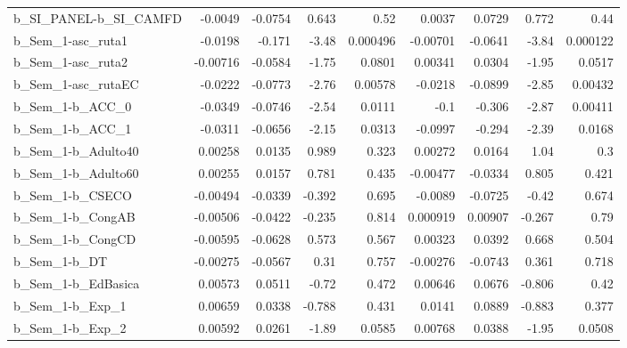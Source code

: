 \begin{tabular}{lrrrrrrrr}
b\_SI\_PANEL-b\_SI\_CAMFD      &     -0.0049 &      -0.0754 &     0.643 &     0.52 &     0.0037 &      0.0729 &        0.772 &          0.44 \\
b\_Sem\_1-asc\_ruta1          &     -0.0198 &       -0.171 &     -3.48 & 0.000496 &   -0.00701 &     -0.0641 &        -3.84 &      0.000122 \\
b\_Sem\_1-asc\_ruta2          &    -0.00716 &      -0.0584 &     -1.75 &   0.0801 &    0.00341 &      0.0304 &        -1.95 &        0.0517 \\
b\_Sem\_1-asc\_rutaEC         &     -0.0222 &      -0.0773 &     -2.76 &  0.00578 &    -0.0218 &     -0.0899 &        -2.85 &       0.00432 \\
b\_Sem\_1-b\_ACC\_0            &     -0.0349 &      -0.0746 &     -2.54 &   0.0111 &       -0.1 &      -0.306 &        -2.87 &       0.00411 \\
b\_Sem\_1-b\_ACC\_1            &     -0.0311 &      -0.0656 &     -2.15 &   0.0313 &    -0.0997 &      -0.294 &        -2.39 &        0.0168 \\
b\_Sem\_1-b\_Adulto40         &     0.00258 &       0.0135 &     0.989 &    0.323 &    0.00272 &      0.0164 &         1.04 &           0.3 \\
b\_Sem\_1-b\_Adulto60         &     0.00255 &       0.0157 &     0.781 &    0.435 &   -0.00477 &     -0.0334 &        0.805 &         0.421 \\
b\_Sem\_1-b\_CSECO            &    -0.00494 &      -0.0339 &    -0.392 &    0.695 &    -0.0089 &     -0.0725 &        -0.42 &         0.674 \\
b\_Sem\_1-b\_CongAB           &    -0.00506 &      -0.0422 &    -0.235 &    0.814 &   0.000919 &     0.00907 &       -0.267 &          0.79 \\
b\_Sem\_1-b\_CongCD           &    -0.00595 &      -0.0628 &     0.573 &    0.567 &    0.00323 &      0.0392 &        0.668 &         0.504 \\
b\_Sem\_1-b\_DT               &    -0.00275 &      -0.0567 &      0.31 &    0.757 &   -0.00276 &     -0.0743 &        0.361 &         0.718 \\
b\_Sem\_1-b\_EdBasica         &     0.00573 &       0.0511 &     -0.72 &    0.472 &    0.00646 &      0.0676 &       -0.806 &          0.42 \\
b\_Sem\_1-b\_Exp\_1            &     0.00659 &       0.0338 &    -0.788 &    0.431 &     0.0141 &      0.0889 &       -0.883 &         0.377 \\
b\_Sem\_1-b\_Exp\_2            &     0.00592 &       0.0261 &     -1.89 &   0.0585 &    0.00768 &      0.0388 &        -1.95 &        0.0508 \\

\end{tabular}
